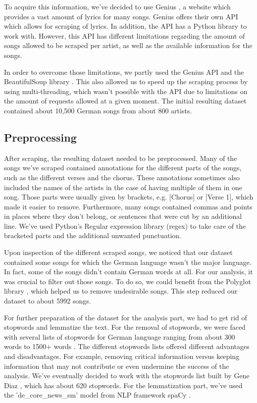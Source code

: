 To acquire this information, we've decided to use Genius \cite{genius}, a website which provides a vast amount of lyrics for many songs. Genius offers their own API which allows for scraping of lyrics. In addition, the API has a Python library to work with. However, this API has different limitations regarding the amount of songs allowed to be scraped per artist, as well as the available information for the songs. 

In order to overcome those limitations, we partly used the Genius API and the BeautifulSoup library \cite{beatifulsoup}. This also allowed us to speed up the scraping process by using multi-threading, which wasn't possible with the API due to limitations on the amount of requests allowed at a given moment. The initial resulting dataset contained about 10,500 German songs from about 800 artists.

\subsection*{Preprocessing}

After scraping, the resulting dataset needed to be preprocessed. Many of the songs we've scraped contained annotations for the different parts of the songs, such as the different verses and the chorus. These annotations sometimes also included the names of the artists in the case of having multiple of them in one song. Those parts were usually given by brackets, e.g. [Chorus] or [Verse 1], which made it easier to remove. Furthermore, many songs contained commas and points in places where they don't belong, or sentences that were cut by an additional line. We've used Python's Regular expression library (regex) to take care of the bracketed parts and the additional unwanted punctuation.

Upon inspection of the different scraped songs, we noticed that our dataset contained some songs for which the German language wasn't the major language. In fact, some of the songs didn't contain German words at all. For our analysis, it was crucial to filter out those songs. To do so, we could benefit from the Polyglot library \cite{polyglot}, which helped us to remove undesirable songs. This step reduced our dataset to about 5992 songs.

For further preparation of the dataset for the analysis part, we had to get rid of stopwords and lemmatize the text. For the removal of stopwords, we were faced with several lists of stopwords for German language ranging from about 300 words to 1500+ words \cite{stopwords1}. The different stopwords lists offered different advantages and disadvantages. For example, removing critical information versus keeping information that may not contribute or even undermine the success of the analysis. We've eventually decided to work with the stopwords list built by Gene Diaz \cite{stopwords2}, which has about 620 stopwords. For the lemmatization part, we've used the 'de\_core\_news\_sm' model from NLP framework spaCy \cite{spacy}.

